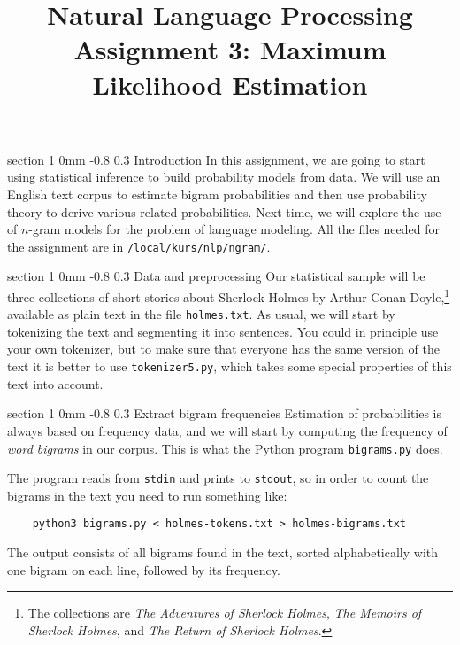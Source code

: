 \documentclass[11pt]{article}
\title{{\LARGE Natural Language Processing}\\[1.5mm]{\large Assignment 3: Maximum Likelihood Estimation}}
\author{}
\date{} %
\makeatletter
\newcommand{\newsec}[2]{\section{#1}\label{sec:#2}\noindent}
\renewcommand{\section}{\@startsection
{section}%
{1}%
{0mm}%
{-0.8\baselineskip}%
{0.3\baselineskip}%
{\bfseries\large}}%
\makeatother
\begin{document}
 

\maketitle
\vspace{-2mm}
\newsec{Introduction}{intro}%
In this assignment, we are going to start using statistical inference to build probability models from data. 
We will use an English text corpus to estimate bigram probabilities and then use probability
theory to derive various related probabilities. Next time, we will explore the use of $n$-gram models 
for the problem of language modeling. All the files needed for the assignment are in {\tt /local/kurs/nlp/ngram/}.

\newsec{Data and preprocessing}{data}%
Our statistical sample will be three collections of short stories about Sherlock Holmes by Arthur Conan Doyle,\footnote{The collections
are {\em The Adventures of Sherlock Holmes}, {\em The Memoirs of Sherlock Holmes}, and {\em The Return of Sherlock Holmes}.}
available as plain text in the file {\tt holmes.txt}. As usual, we will start by tokenizing the text and segmenting it into sentences. 
You could in principle use your own tokenizer, but to make sure that everyone has the same version of the text it is better to use
{\tt tokenizer5.py}, which takes some special properties of this text into account.

\newsec{Extract bigram frequencies}{bigrams}%
Estimation of probabilities is always based on frequency data, and we will start by computing the
frequency of \emph{word bigrams} in our corpus. This is what the Python program {\tt bigrams.py}
does.

\begin{center}
\fbox{

}
\end{center}
\newpage
\noindent
The program reads from {\tt stdin} and prints to {\tt stdout}, so in order to count the bigrams in the text you
need to run something like:
\begin{verbatim}
    python3 bigrams.py < holmes-tokens.txt > holmes-bigrams.txt
\end{verbatim}
The output consists of all bigrams found in the text, sorted alphabetically with one bigram on 
each line, followed by its frequency. 
\end{document}
